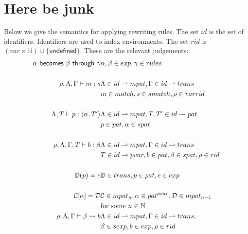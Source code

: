 
\section{Here be junk}


Below we give the semantics for applying rewriting rules. The set $id$ is the
set of identifiers. Identifiers are used to index environments. The set $rid$ is
$(var \times \mathbb{N}) \cup \{\textsf{undefined}\}$. These are the relevant
judgements:
\begin{eqnarray*}[l@{\quad\quad\quad}l]
  \becomesthrough{\alpha}{\beta}{\gamma} &\alpha, \beta \in exp, \gamma
  \in rules\\
  \\
  \rho, \Lambda, \Gamma |- m : s & \Lambda \in id \rightharpoonup mpat, \Gamma \in id
  \rightharpoonup trans\\
  & m \in match, s \in smatch, \rho \in var rid\\
  \\
  \Lambda, T |- p : \langle \alpha, T' \rangle & \Lambda \in id \rightharpoonup
  mpat, T, T' \in id \rightharpoonup pat\\
  & p \in pat, \alpha \in spat\\
  \\
  \rho, \Lambda, \Gamma, T |- b : \beta & \Lambda \in id \rightharpoonup mpat,
  \Gamma \in id \rightharpoonup trans\\
  & T \in id \rightharpoonup pvar, b \in pat, \beta \in spat, \rho \in rid\\
  \\
  \mathbb{D}(p) = e & \mathbb{D} \in trans, p \in pat, e \in exp\\
  \\
  \mathcal{C}[\alpha] = \mathcal{D} & \mathcal{C} \in mpat_n, \alpha \in
  pat^{pvar}, \mathcal{D} \in mpat_{n - 1}\\
  &\text{for some $n \in
    \mathbb{N}$}\\
  \rho, \Lambda, \Gamma |- \beta \leadsto b & \Lambda \in id \rightharpoonup mpat,
  \Gamma \in id \rightharpoonup trans,\\
  & \beta \in sexp, b \in exp, \rho \in rid\\
  \\
\end{eqnarray*}

